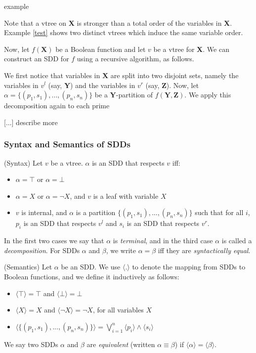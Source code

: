 \documentclass{article}
\newenvironment{definition}[1][Definition]{\begin{trivlist}
\item[\hskip \labelsep {\bfseries #1}]}{\end{trivlist}}
\newenvironment{example}[1][Example]{\begin{trivlist}
\item[\hskip \labelsep {\bfseries #1}]}{\end{trivlist}}
\begin{document}
\begin{example}
example
\end{example}


Note that a vtree on \textbf{X} is stronger than a total order of the variables in \textbf{X}. Example \ref{test} shows two distinct vtrees which induce the same variable order. 

Now, let $f(\textbf{X})$ be a Boolean function and let $v$ be a vtree for \textbf{X}. We can construct an SDD for $f$ using a recursive algorithm, as follows.

 We first notice that variables in \textbf{X} are split into two disjoint sets, namely the variables in $v^l$ (say, \textbf{Y}) and the variables in $v^r$ (say, \textbf{Z}). Now, let $\alpha =  \{(p_1, s_1),...,(p_n, s_n)\}$ be a \textbf{Y}-partition of $f(\textbf{Y}, \textbf{Z})$. We apply this decomposition again to each prime 

[...] describe more
\subsubsection{Syntax and Semantics of SDDs}


\begin{definition} (Syntax)
Let $v$ be a vtree. $\alpha$ is an SDD that respects $v$ iff: 
\begin{itemize} 
\item $\alpha = \top$ or $\alpha = \bot$
\item $\alpha = X$ or $\alpha = \lnot X$, and $v$ is a leaf with variable $X$
\item $v$ is internal, and $\alpha$ is a partition  $\{(p_1, s_1), ..., (p_n, s_n)\}$ such that for all $i$, $p_i$ is an SDD that respects $v^l$ and $s_i$ is an SDD that respects $v^r$.
\end{itemize}
In the first two cases we say that $\alpha$ is \textit{terminal}, and in the third case $\alpha$ is called a \textit{decomposition}. For SDDs $\alpha$ and $\beta$, we write $\alpha = \beta$ iff they are \textit{syntactically equal}.
\end{definition}

\begin{definition} (Semantics)
Let $\alpha$ be an SDD. We use $\langle . \rangle$ to denote the mapping from SDDs to Boolean functions, and we define it inductively as follows: 
\begin{itemize} 
\item $\langle \top \rangle = \top$ and  $\langle \bot \rangle = \bot$
\item $\langle X \rangle = X$ and $\langle \lnot X \rangle = \lnot X$, for all variables $X$
\item $\langle\{(p_1, s_1), ..., (p_n, s_n)\}\rangle = \bigvee_{i = 1}^n \langle p_i \rangle \land \langle s_i \rangle  $
\end{itemize}
We say two SDDs $\alpha$ and $\beta$ are \textit{equivalent} (written $\alpha \equiv \beta$) if $\langle \alpha \rangle = \langle \beta \rangle$.

\end{definition}
\end{document}
